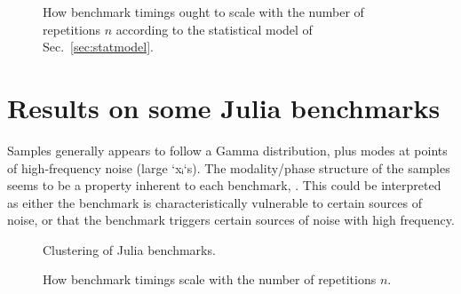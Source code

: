 \documentclass[conference]{IEEEtran}
\begin{document}
\begin{figure}[!t]
\centering
{}
\caption{How benchmark timings ought to scale with the number of repetitions $n$ according to the statistical model of Sec.~\ref{sec:statmodel}.}
\label{fig:idealscaling}
\end{figure}

\section{Results on some Julia benchmarks}

Samples generally appears to follow a Gamma distribution, plus modes at points of high-frequency noise (large `xᵢ`s). The modality/phase structure of the samples seems to be a property inherent to each benchmark, . This could be interpreted as either the benchmark is characteristically vulnerable to certain sources of noise, or that the benchmark triggers certain sources of noise with high frequency.


\begin{figure}[!t]
\centering
{}
\caption{Clustering of Julia benchmarks.}
\label{fig:benchclusters}
\end{figure}

\begin{figure}[!t]
\centering
{}
\caption{How benchmark timings scale with the number of repetitions $n$.}
\label{fig:scaling}
\end{figure}

%
\end{document}
